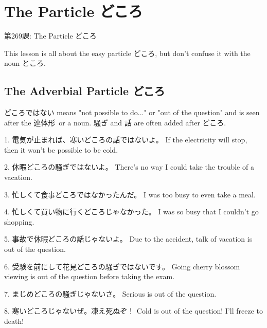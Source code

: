     
\chapter{The Particle どころ}

\begin{center}
\begin{Large}
第269課: The Particle どころ 
\end{Large}
\end{center}
 
\par{ This lesson is all about the easy particle どころ, but don't confuse it with the noun ところ. }
      
\section{The Adverbial Particle どころ}
 
\par{ どころではない means "not possible to do\dothyp{}\dothyp{}\dothyp{}" or "out of the question" and is seen after the 連体形 or a noun. 騒ぎ and 話 are often added after どころ. }

\par{1. 電気が止まれば、寒いどころの話ではないよ。 \hfill\break
If the electricity will stop, then it won't be possible to be cold. }

\par{2. 休暇どころの騒ぎではないよ。 \hfill\break
There's no way I could take the trouble of a vacation. }

\par{3. 忙しくて食事どころではなかったんだ。 \hfill\break
I was too busy to even take a meal. }

\par{4. 忙しくて買い物に行くどころじゃなかった。 \hfill\break
I was so busy that I couldn't go shopping. }

\par{5. 事故で休暇どころの話じゃないよ。 \hfill\break
Due to the accident, talk of vacation is out of the question. }

\par{6. 受験を前にして花見どころの騒ぎではないです。 \hfill\break
Going cherry blossom viewing is out of the question before taking the exam. }

\par{7. まじめどころの騒ぎじゃないさ。 \hfill\break
Serious is out of the question. }

\par{8. 寒いどころじゃないぜ。凍え死ぬぞ！ \hfill\break
Cold is out of the question! I'll freeze to death! }

